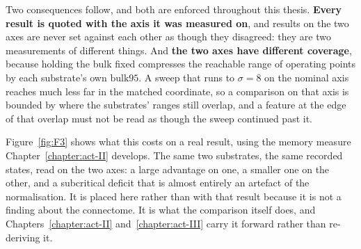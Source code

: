 Two consequences follow, and both are enforced throughout this thesis.
\textbf{Every result is quoted with the axis it was measured on}, and results on
the two axes are never set against each other as though they disagreed: they are
two measurements of different things. And \textbf{the two axes have different
coverage}, because holding the bulk fixed compresses the reachable range of
operating points by each substrate's own $\mathrm{bulk95}$. A sweep that runs to
$\sigma = 8$ on the nominal axis reaches much less far in the matched
coordinate, so a comparison on that axis is bounded by where the substrates'
ranges still overlap, and a feature at the edge of that overlap must not be read
as though the sweep continued past it.

Figure~\ref{fig:F3} shows what this costs on a real result, using the memory
measure Chapter~\ref{chapter:act-II} develops. The same two substrates, the same
recorded states, read on the two axes: a large advantage on one, a smaller one on
the other, and a subcritical deficit that is almost entirely an artefact of the
normalisation. It is placed here rather than with that result because it is not
a finding about the connectome. It is what the comparison itself does, and
Chapters~\ref{chapter:act-II} and~\ref{chapter:act-III} carry it forward rather
than re-deriving it.


